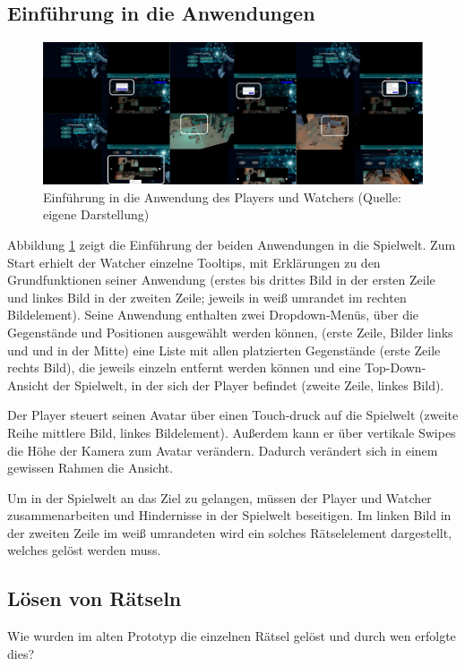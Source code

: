 \subsection{Einführung in die Anwendungen}

\begin{figure}[ht]
\centering
\includegraphics[width=1\linewidth]{content/pictures/Introduction.png}
\caption{Einführung in die Anwendung des Players und Watchers (Quelle: eigene Darstellung)}
\label{fig:old-introductions}
\end{figure}

Abbildung \ref{fig:old-introductions} zeigt die Einführung der beiden Anwendungen in die Spielwelt. Zum Start erhielt der Watcher einzelne Tooltips, mit Erklärungen zu den Grundfunktionen seiner Anwendung (erstes bis drittes Bild in der ersten Zeile und linkes Bild in der zweiten Zeile; jeweils in weiß umrandet im rechten Bildelement). Seine Anwendung enthalten zwei Dropdown-Menüs, über die Gegenstände und Positionen ausgewählt werden können, (erste Zeile, Bilder links und und in der Mitte) eine Liste mit allen platzierten Gegenstände (erste Zeile rechts Bild), die jeweils einzeln entfernt werden können und eine Top-Down-Ansicht der Spielwelt, in der sich der Player befindet (zweite Zeile, linkes Bild). 

Der Player steuert seinen Avatar über einen Touch-druck auf die Spielwelt (zweite Reihe mittlere Bild, linkes Bildelement). Außerdem kann er über vertikale Swipes die Höhe der Kamera zum Avatar verändern. Dadurch verändert sich in einem gewissen Rahmen die Ansicht.

Um in der Spielwelt an das Ziel zu gelangen, müssen der Player und Watcher zusammenarbeiten und Hindernisse in der Spielwelt beseitigen. Im linken Bild in der zweiten Zeile im weiß umrandeten wird ein solches Rätselelement dargestellt, welches gelöst werden muss.

\subsection{Lösen von Rätseln}
Wie wurden im alten Prototyp die einzelnen Rätsel gelöst und durch wen erfolgte dies?

